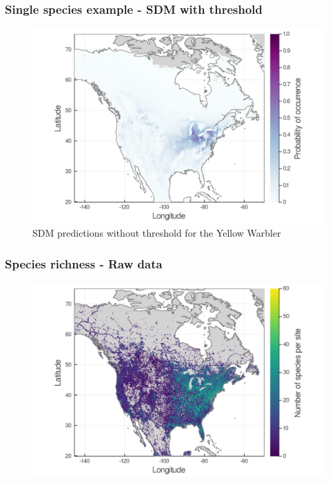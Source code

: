 \documentclass[10pt]{beamer}
\begin{document}
\begin{frame}
  \frametitle{Single species example - SDM with threshold}
  \begin{figure}
    \centering
    \hspace*{-0cm}\includegraphics[scale=0.17]{fig/01_sdm_singlesp.png}
    \caption{SDM predictions without threshold for the Yellow Warbler}
  \end{figure}
\end{frame}

\begin{frame}
  \frametitle{Species richness - Raw data}
  \begin{figure}
    \centering
    \hspace*{-0cm}\includegraphics[scale=0.17]{fig/03_raw_richness.png}
  \end{figure}
\end{frame}
\end{document}
